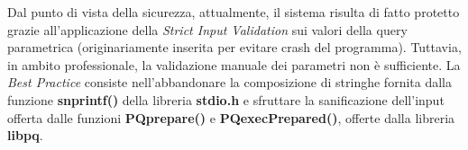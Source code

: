 Dal punto di vista della sicurezza, attualmente, il sistema risulta di
fatto protetto grazie all'applicazione della \textit{Strict Input
Validation} sui valori della query parametrica (originariamente inserita
per evitare crash del programma).
Tuttavia, in ambito professionale, la validazione manuale dei parametri
non è sufficiente. La \textit{Best Practice} consiste nell'abbandonare
la composizione di stringhe fornita dalla funzione \textbf{snprintf()} della
libreria \textbf{stdio.h} e sfruttare la sanificazione dell'input
offerta dalle funzioni \textbf{PQprepare()} e \textbf{PQexecPrepared()},
offerte dalla libreria \textbf{libpq}.
